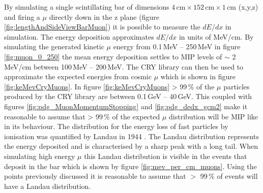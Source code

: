 By simulating a single scintillating bar of dimensions $4\,\textrm{cm} \times 152\,\textrm{cm} \times 1\,\textrm{cm}$ (x,y,z) and firing a $\mu$ directly down in the z plane (figure \ref{fig:lengthAndSideViewBarMuon}) it is possible to measure the $dE/dx$ in simulation. The energy deposition approximates $dE/dx$ in units of MeV/cm. By simulating the generated kinetic $\mu$ energy from 0.1\,MeV -- 250\,MeV in figure \ref{fig:muon_0_250} the mean energy deposition settles to MIP levels of $\sim$ 2 MeV/cm between 100\,MeV -- 200\,MeV. The CRY library \cite{ieee_cry_2007} can then be used to approximate the expected energies from cosmic $\mu$ which is shown in figure \ref{fig:keMevCryMuons}. In figure \ref{fig:keMevCryMuons} > 99\,\% of the $\mu$ particles produced by the CRY library are between 0.1\,GeV -- 40\,GeV. This coupled with figures \ref{fig:pdg_MuonMomentumStopping} and \ref{fig:pdg_dedx_gcm2} make it reasonable to assume that > 99\,\% of the expected $\mu$ distribution will be MIP like in its behaviour. The distribution for the energy loss of fast particles by ionisation was quantified by Landau in 1944 \cite{landau1944energy}. The Landau distribution represents the energy deposited and is characterised by a sharp peak with a long tail. When simulating high energy $\mu$ this Landau distribution is visible in the events that deposit in the bar which is shown by figure \ref{fig:mev_per_cm_muons}. Using the points previously discussed it is reasonable to assume that $>$ 99\,\% of events will have a Landau distribution. %

